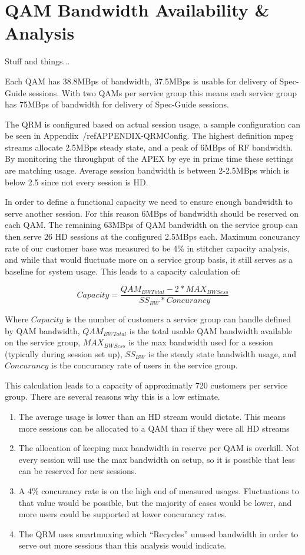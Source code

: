 \documentclass{article}
\begin{document}
\section{QAM Bandwidth Availability \& Analysis}
\label{SECTION-QAMCapacity}

Stuff and things... 

Each QAM has 38.8MBps of bandwidth, 37.5MBps is usable for delivery of Spec-Guide sessions. With two QAMs per service group this means each service group has 75MBps of bandwidth for delivery of Spec-Guide sessions. 

The QRM is configured based on actual session usage, a sample configuration can be seen in Appendix~/ref{APPENDIX-QRMConfig}. The highest definition mpeg streams allocate 2.5MBps steady state, and a peak of 6MBps of RF bandwidth. By monitoring the throughput of the APEX by eye in prime time these settings are matching usage. Average session bandwidth is between 2-2.5MBps which is below 2.5 since not every session is HD. 

In order to define a functional capacity we need to ensure enough bandwidth to serve another session. For this reason 6MBps of bandwidth should be reserved on each QAM. The remaining 63MBps of QAM bandwidth on the service group can then serve 26 HD sessions at the configured 2.5MBps each. Maximum concurancy rate of our customer base was measured to be 4\% in stitcher capacity analysis, and while that would fluctuate more on a service group basis, it still serves as a baseline for system usage. This leads to a capacity calculation of: 

$$Capacity=\frac{QAM_{BWTotal}-2*MAX_{BWSess}}{SS_{BW}*Concurancy}$$ 

Where $Capacity$ is the number of customers a service group can handle defined by QAM bandwidth, $QAM_{BWTotal}$ is the total usable QAM bandwidth available on the service group, $MAX_{BWSess}$ is the max bandwidth used for a session (typically during session set up), $SS_{BW}$ is the steady state bandwidth usage, and $Concurancy$ is the concurancy rate of users in the service group. 

This calculation leads to a capacity of approximatly 720 customers per service group. There are several reasons why this is a low estimate. 

\begin{enumerate}
\item The average usage is lower than an HD stream would dictate. This means more sessions can be allocated to a QAM than if they were all HD streams
\item The allocation of keeping max bandwidth in reserve per QAM is overkill. Not every session will use the max bandwidth on setup, so it is possible that less can be reserved for new sessions. 
\item A 4\% concurancy rate is on the high end of measured usages. Fluctuations to that value would be possible, but the majority of cases would be lower, and more users could be supported at lower concurancy rates. 
\item The QRM uses smartmuxing which ``Recycles'' unused bandwidth in order to serve out more sessions than this analysis would indicate. 
\end{enumerate}
\end{document}
